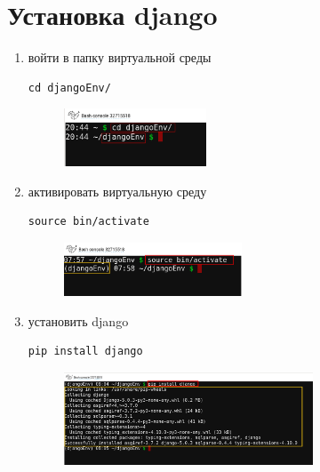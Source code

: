 \documentclass[12pt]{article}
\begin{document}
\section{Установка django}
	\begin{enumerate}
    \item войти в папку виртуальной среды
			\begin{lstlisting}[caption=\phantom{},style=conlst,label={lst:enter_desktop}]
      cd djangoEnv/
			\end{lstlisting}
	\begin{figure}[H]
		\centering
		\includegraphics[width=0.4\textwidth ,keepaspectratio]{imgs/enter_venv_folder.png}
		\caption{}
	\end{figure}

    \item активировать виртуальную среду
			\begin{lstlisting}[caption=\phantom{},style=conlst,label={lst:enter_desktop}]
      source bin/activate
			\end{lstlisting}
	\begin{figure}[H]
		\centering
		\includegraphics[width=0.5\textwidth ,keepaspectratio]{imgs/activate_venv.png}
		\caption{}
	\end{figure}

    \item установить django
			\begin{lstlisting}[caption=\phantom{},style=conlst,label={lst:enter_desktop}]
      pip install django
			\end{lstlisting}
	\begin{figure}[H]
		\centering
		\includegraphics[width=0.7\textwidth ,keepaspectratio]{imgs/install_django.png}
		\caption{}
	\end{figure}


\end{enumerate}
\end{document}
